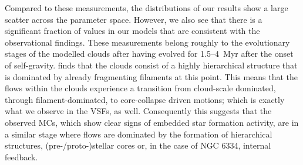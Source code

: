 Compared to these measurements, the distributions of our results show a large scatter across the parameter space. 
However, we also see that there is a significant fraction of values in our models that are consistent with the observational findings. 
These measurements belong roughly to the evolutionary stages of the modelled clouds after having evolved for 1.5--4~Myr after the onset of self-gravity.
 finds that the clouds consist of a highly hierarchical structure that is dominated by already fragmenting filaments at this point.
This means that the flows within the clouds experience a transition from cloud-scale dominated, through filament-dominated, to core-collapse driven motions; which is exactly what we observe in the VSFs, as well.
Consequently this suggests that the observed MCs, which show clear signs of embedded star formation activity, are in a similar stage where flows are dominated by the formation of hierarchical structures, (pre-/proto-)stellar cores or, in the case of NGC 6334, internal feedback.

